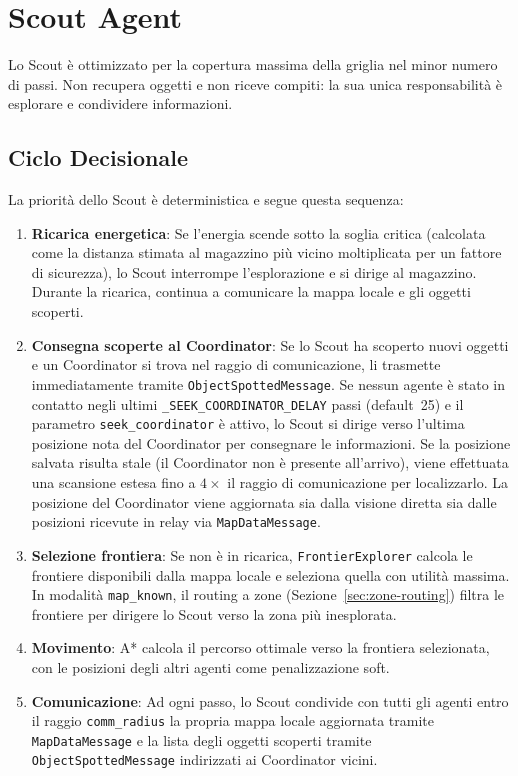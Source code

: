 \chapter{Scout Agent}

Lo Scout \`e ottimizzato per la copertura massima della griglia nel minor numero di passi.
Non recupera oggetti e non riceve compiti: la sua unica responsabilit\`a \`e esplorare
e condividere informazioni.

\section{Ciclo Decisionale}

La priorit\`a dello Scout \`e deterministica e segue questa sequenza:

\begin{enumerate}
    \item \textbf{Ricarica energetica}: Se l'energia scende sotto la soglia critica (calcolata
          come la distanza stimata al magazzino pi\`u vicino moltiplicata per un fattore di
          sicurezza), lo Scout interrompe l'esplorazione e si dirige al magazzino. Durante
          la ricarica, continua a comunicare la mappa locale e gli oggetti scoperti.
    \item \textbf{Consegna scoperte al Coordinator}: Se lo Scout ha scoperto nuovi oggetti
          e un Coordinator si trova nel raggio di comunicazione, li trasmette immediatamente
          tramite \texttt{ObjectSpottedMessage}. Se nessun agente \`e stato in contatto
          negli ultimi \linebreak[2]\texttt{\_SEEK\_COORDINATOR\_DELAY} passi (default~25) e il parametro
          \texttt{seek\_coordinator} \`e attivo, lo Scout si dirige verso l'ultima posizione
          nota del Coordinator per consegnare le informazioni. Se la posizione salvata
          risulta stale (il Coordinator non \`e presente all'arrivo), viene effettuata
          una scansione estesa fino a $4\times$ il raggio di comunicazione per localizzarlo.
          La posizione del Coordinator viene aggiornata sia dalla visione diretta sia
          dalle posizioni ricevute in relay via \texttt{MapDataMessage}.
    \item \textbf{Selezione frontiera}: Se non \`e in ricarica, \texttt{FrontierExplorer}
          calcola le frontiere disponibili dalla mappa locale e seleziona quella con utilit\`a
          massima. In modalit\`a \texttt{map\_known}, il routing a zone (Sezione~\ref{sec:zone-routing})
          filtra le frontiere per dirigere lo Scout verso la zona pi\`u inesplorata.
    \item \textbf{Movimento}: A* calcola il percorso ottimale verso la frontiera selezionata,
          con le posizioni degli altri agenti come penalizzazione soft.
    \item \textbf{Comunicazione}: Ad ogni passo, lo Scout condivide con tutti gli agenti
          entro il raggio \texttt{comm\_radius} la propria mappa locale aggiornata tramite
          \texttt{MapDataMessage} e la lista degli oggetti scoperti tramite
          \texttt{ObjectSpottedMessage} indirizzati ai Coordinator vicini.
\end{enumerate}

